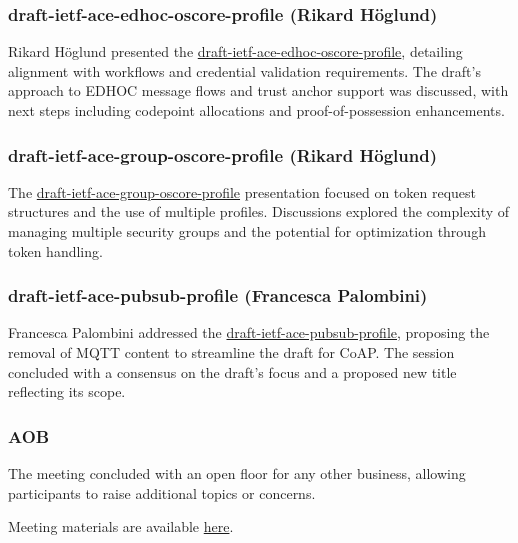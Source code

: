 \documentclass{article}
\begin{document}
\subsubsection{draft-ietf-ace-edhoc-oscore-profile (Rikard Höglund)}

Rikard Höglund presented the \href{https://datatracker.ietf.org/doc/html/draft-ietf-ace-edhoc-oscore-profile}{draft-ietf-ace-edhoc-oscore-profile}, detailing alignment with workflows and credential validation requirements. The draft's approach to EDHOC message flows and trust anchor support was discussed, with next steps including codepoint allocations and proof-of-possession enhancements.

\subsubsection{draft-ietf-ace-group-oscore-profile (Rikard Höglund)}

The \href{https://datatracker.ietf.org/doc/html/draft-ietf-ace-group-oscore-profile}{draft-ietf-ace-group-oscore-profile} presentation focused on token request structures and the use of multiple profiles. Discussions explored the complexity of managing multiple security groups and the potential for optimization through token handling.

\subsubsection{draft-ietf-ace-pubsub-profile (Francesca Palombini)}

Francesca Palombini addressed the \href{https://datatracker.ietf.org/doc/html/draft-ietf-ace-pubsub-profile}{draft-ietf-ace-pubsub-profile}, proposing the removal of MQTT content to streamline the draft for CoAP. The session concluded with a consensus on the draft's focus and a proposed new title reflecting its scope.

\subsubsection{AOB}

The meeting concluded with an open floor for any other business, allowing participants to raise additional topics or concerns.

Meeting materials are available \href{https://datatracker.ietf.org/meeting/122/materials/}{here}.



\newpage
\end{document}
